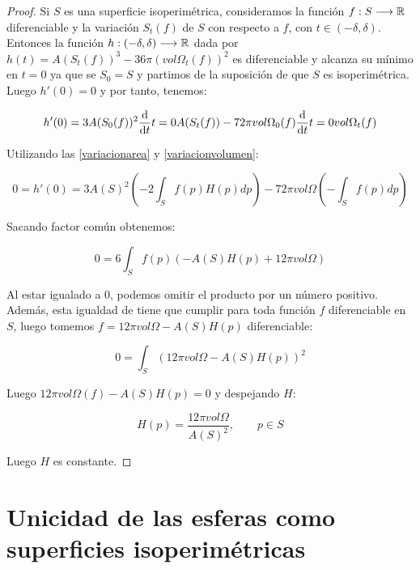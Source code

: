 \begin{proof}
Si $S$ es una superficie isoperimétrica, consideramos la función $f: S \longrightarrow \mathbb{R}$ diferenciable y la variación $S_t(f)$ de $S$ con respecto a $f$, con $t \in (-\delta, \delta)$. Entonces la función $h: (-\delta, \delta) \longrightarrow \mathbb{R}$ dada por $h(t) = A(S_t(f))^3 - 36\pi(vol \Omega_t(f))^2$ es diferenciable y alcanza su mínimo en $t=0$ ya que se $S_0=S$ y partimos de la suposición de que $S$ es isoperimétrica. Luego $h'(0)=0$ y por tanto, tenemos:

\begin{equation*}
    h'(0) = 3A(S_0(f))^2 \diff{}{t}{t=0} A(S_t(f)) - 72\pi vol \Omega_0(f) \diff{}{t}{t=0} vol \Omega_t(f)
\end{equation*}

Utilizando las \autoref{variacionarea} y \autoref{variacionvolumen}:

\begin{equation*}
    0 = h'(0) = 3A(S)^2 \left( -2 \int_S f(p)H(p)dp \right) - 72\pi vol \Omega \left( - \int_S f(p) dp \right)
\end{equation*}

Sacando factor común obtenemos:

\begin{equation*}
    0 = 6 \int_S f(p)(-A(S)H(p) + 12 \pi vol \Omega)
\end{equation*}

Al estar igualado a $0$, podemos omitir el producto por un número positivo. Además, esta igualdad de tiene que cumplir para toda función $f$ diferenciable en $S$, luego tomemos $f = 12 \pi vol \Omega - A(S)H(p)$ diferenciable:

\begin{equation*}
    0 = \int_S (12 \pi vol \Omega - A(S)H(p))^2
\end{equation*}

Luego $12 \pi vol \Omega(f) - A(S)H(p) = 0$ y despejando $H$:

\begin{equation*}
    H(p) = \frac{12 \pi vol \Omega}{A(S)^2}, \qquad p \in S
\end{equation*}


Luego $H$ es constante.
\end{proof}

\section{Unicidad de las esferas como superficies isoperimétricas}

